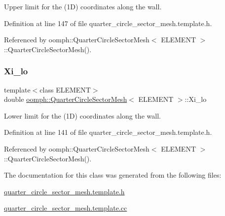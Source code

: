 Upper limit for the (1D) coordinates along the wall. 



Definition at line 147 of file quarter\+\_\+circle\+\_\+sector\+\_\+mesh.\+template.\+h.



Referenced by oomph\+::\+Quarter\+Circle\+Sector\+Mesh$<$ E\+L\+E\+M\+E\+N\+T $>$\+::\+Quarter\+Circle\+Sector\+Mesh().

\mbox{\label{classoomph_1_1QuarterCircleSectorMesh_ab5c1e4484c69eb78bd3323321605a93c}} 
\subsubsection{\texorpdfstring{Xi\+\_\+lo}{Xi\_lo}}
{\footnotesize\ttfamily template$<$class E\+L\+E\+M\+E\+NT$>$ \\
double \hyperlink{classoomph_1_1QuarterCircleSectorMesh}{oomph\+::\+Quarter\+Circle\+Sector\+Mesh}$<$ E\+L\+E\+M\+E\+NT $>$\+::Xi\+\_\+lo\hspace{0.3cm}{\ttfamily [protected]}}



Lower limit for the (1D) coordinates along the wall. 



Definition at line 141 of file quarter\+\_\+circle\+\_\+sector\+\_\+mesh.\+template.\+h.



Referenced by oomph\+::\+Quarter\+Circle\+Sector\+Mesh$<$ E\+L\+E\+M\+E\+N\+T $>$\+::\+Quarter\+Circle\+Sector\+Mesh().



The documentation for this class was generated from the following files\+:\begin{DoxyCompactItemize}
\item 
\hyperlink{quarter__circle__sector__mesh_8template_8h}{quarter\+\_\+circle\+\_\+sector\+\_\+mesh.\+template.\+h}\item 
\hyperlink{quarter__circle__sector__mesh_8template_8cc}{quarter\+\_\+circle\+\_\+sector\+\_\+mesh.\+template.\+cc}\end{DoxyCompactItemize}
